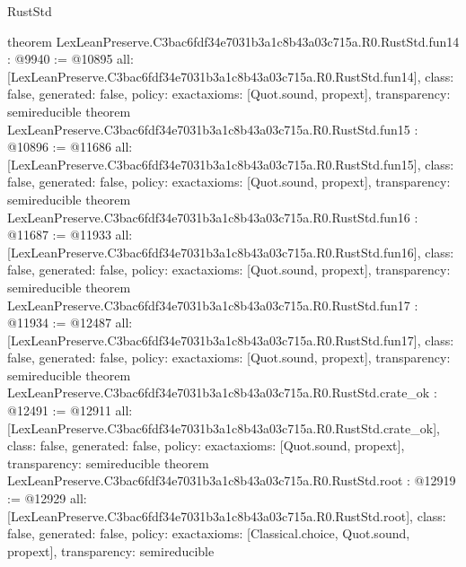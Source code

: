 \begin{lexlean}{RustStd}
\begin{coremodule}
{}
theorem LexLeanPreserve.C3bac6fdf34e7031b3a1c8b43a03c715a.R0.RustStd.fun14 : @9940 := @10895 {
  all: [LexLeanPreserve.C3bac6fdf34e7031b3a1c8b43a03c715a.R0.RustStd.fun14],
  class: false,
  generated: false,
  policy: exact{axioms: [Quot.sound, propext]},
  transparency: semireducible
}
theorem LexLeanPreserve.C3bac6fdf34e7031b3a1c8b43a03c715a.R0.RustStd.fun15 : @10896 := @11686 {
  all: [LexLeanPreserve.C3bac6fdf34e7031b3a1c8b43a03c715a.R0.RustStd.fun15],
  class: false,
  generated: false,
  policy: exact{axioms: [Quot.sound, propext]},
  transparency: semireducible
}
theorem LexLeanPreserve.C3bac6fdf34e7031b3a1c8b43a03c715a.R0.RustStd.fun16 : @11687 := @11933 {
  all: [LexLeanPreserve.C3bac6fdf34e7031b3a1c8b43a03c715a.R0.RustStd.fun16],
  class: false,
  generated: false,
  policy: exact{axioms: [Quot.sound, propext]},
  transparency: semireducible
}
theorem LexLeanPreserve.C3bac6fdf34e7031b3a1c8b43a03c715a.R0.RustStd.fun17 : @11934 := @12487 {
  all: [LexLeanPreserve.C3bac6fdf34e7031b3a1c8b43a03c715a.R0.RustStd.fun17],
  class: false,
  generated: false,
  policy: exact{axioms: [Quot.sound, propext]},
  transparency: semireducible
}
theorem LexLeanPreserve.C3bac6fdf34e7031b3a1c8b43a03c715a.R0.RustStd.crate_ok : @12491 := @12911 {
  all: [LexLeanPreserve.C3bac6fdf34e7031b3a1c8b43a03c715a.R0.RustStd.crate_ok],
  class: false,
  generated: false,
  policy: exact{axioms: [Quot.sound, propext]},
  transparency: semireducible
}
theorem LexLeanPreserve.C3bac6fdf34e7031b3a1c8b43a03c715a.R0.RustStd.root : @12919 := @12929 {
  all: [LexLeanPreserve.C3bac6fdf34e7031b3a1c8b43a03c715a.R0.RustStd.root],
  class: false,
  generated: false,
  policy: exact{axioms: [Classical.choice, Quot.sound, propext]},
  transparency: semireducible
}


\end{coremodule}
\end{lexlean}

